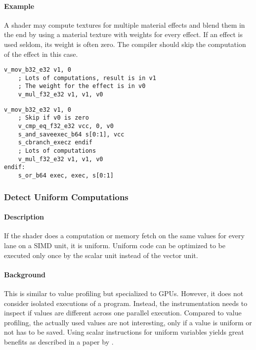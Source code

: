 \paragraph{Example} A shader may compute textures for multiple material effects and blend them in the end by using a material texture with weights for every effect.
If an effect is used seldom, its weight is often zero. The compiler should skip the computation of the effect in this case.\ \\
\begin{minipage}{.47\textwidth}
	\begin{lstlisting}[caption={Value Profiling --- unoptimized},frame=tlrb,language={[amdgpu]Assembler}]
	v_mov_b32_e32 v1, 0
	; Lots of computations, result is in v1
	; The weight for the effect is in v0
	v_mul_f32_e32 v1, v1, v0
	\end{lstlisting}
\end{minipage}\hfill
\begin{minipage}{.47\textwidth}
	\begin{lstlisting}[caption={Value Profiling --- optimized},frame=tlrb,language={[amdgpu]Assembler}]
	v_mov_b32_e32 v1, 0
	; Skip if v0 is zero
	v_cmp_eq_f32_e32 vcc, 0, v0
	s_and_saveexec_b64 s[0:1], vcc
	s_cbranch_execz endif
	; Lots of computations
	v_mul_f32_e32 v1, v1, v0
endif:
	s_or_b64 exec, exec, s[0:1]
	\end{lstlisting}
\end{minipage}

\subsubsection{Detect Uniform Computations}
\paragraph{Description} If the shader does a computation or memory fetch on the same values for every lane on a SIMD unit, it is uniform. Uniform code can be optimized to be executed only once by the scalar unit instead of the vector unit.
\paragraph{Background} This is similar to value profiling but specialized to GPUs. However, it does not consider isolated executions of a program. Instead, the instrumentation needs to inspect if values are different across one parallel execution. Compared to value profiling, the actually used values are not interesting, only if a value is uniform or not has to be saved. Using scalar instructions for uniform variables yields great benefits as described in a paper by \citet{Chen2016}.
